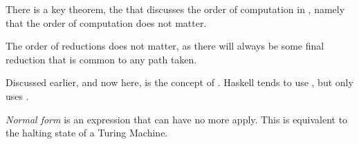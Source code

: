 There is a key theorem, the  that discusses the order of computation in , namely that the order of computation does not matter.

\begin{theorem}\label{thm:Church_Rosser_Theorem}
  The order of reductions does not matter, as there will always be some final reduction that is common to any path taken.
\end{theorem}

Discussed earlier, and now here, is the concept of .
Haskell tends to use , but  only uses .
\begin{definition}\label{def:Normal_Form}
  \emph{Normal form} is an expression that can have no more  apply.
  This is equivalent to the halting state of a Turing Machine.
\end{definition}


